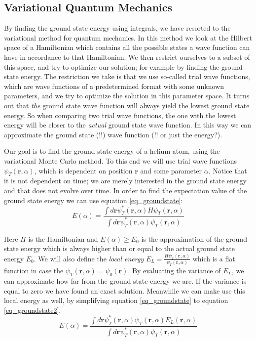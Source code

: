\subsection{Variational Quantum Mechanics}

By finding the ground state energy using integrals, we have resorted to the variational method for quantum
mechanics. In this method we look at the Hilbert space of a Hamiltonian which contains all the possible states
a wave function can have in accordance to that Hamiltonian. We then restrict ourselves to a subset of this space,
and try to optimize our solution; for example by finding the ground state energy. The restriction we take is that
we use so-called trial wave functions, which are wave functions of a predetermined format with some unknown parameters,
and we try to optimize the solution in this parameter space. It turns out that \textit{the} ground state wave function
will always yield the lowest ground state energy. So when comparing two trial wave functions, the one with the lowest
energy will be closer to the \textit{actual} ground state wave function. In this way we can approximate the ground state
(!!) wave function (!! or just the energy?). \cite{AdvStatMech}


Our goal is to find the ground state energy of a helium atom, using the variational Monte Carlo method. To this end we will
use trial wave functions $\psi_T(\textbf{r},\alpha)$, which is dependent on position $\textbf{r}$ and some parameter $\alpha$.
Notice that it is not dependent on time; we are merely interested in the ground state energy and that does not evolve over time.
In order to find the expectation value of the ground state energy we can use equation \ref{eq_groundstate}:
\begin{equation}\label{eq_groundstate}
E(\alpha) = \frac{\int d\textbf{r} \psi_T^*(\textbf{r},\alpha)H\psi_T(\textbf{r},\alpha)}{\int d\textbf{r}
 \psi_T^*(\textbf{r},\alpha)\psi_T(\textbf{r},\alpha)}
\end{equation}

Here $H$ is the Hamiltonian and $E(\alpha) \geq E_0$ is the approximation of the ground state energy which is always higher
than or equal to the actual ground state energy $E_0$.  We will also define the
\textit{local energy} $E_L = \frac{H\psi_T(\textbf{r},\alpha)}{\psi_T(\textbf{r},\alpha)}$ which is a flat function in case
the $\psi_T(\textbf{r},\alpha) = \psi_0(\textbf{r})$. By evaluating the variance of $E_L$, we can approximate how far from
the ground state energy we are. If the variance is equal to zero we have found an exact solution. Meanwhile we can make use
this local energy as well, by simplifying equation \ref{eq_groundstate} to equation \ref{eq_groundstate2}.
\begin{equation}\label{eq_groundstate2}
E(\alpha) = \frac{\int d\textbf{r} \psi_T^*(\textbf{r},\alpha)\psi_T(\textbf{r},\alpha)E_L(\textbf{r},\alpha)}{\int d\textbf{r} \psi_T^*(\textbf{r},\alpha)\psi_T(\textbf{r},\alpha)}
\end{equation}

